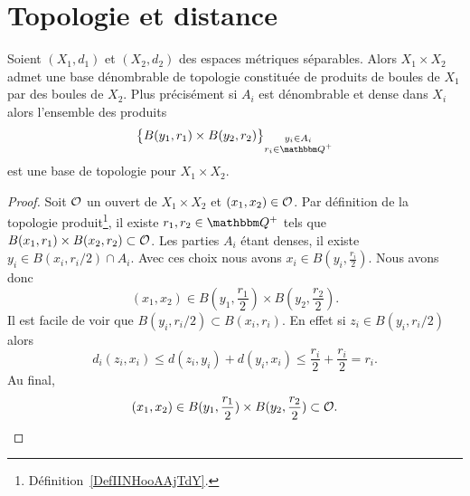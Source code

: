 
\section{Topologie et distance}

\begin{lemma}   \label{LemDUJXooWsnmpL}
    Soient \( (X_1,d_1)\) et \( (X_2,d_2)\) des espaces métriques séparables. Alors \( X_1\times X_2\) admet une base dénombrable de topologie constituée de produits de boules de \( X_1\) par des boules de \( X_2\). Plus précisément si $A_i$ est dénombrable et dense dans \( X_i\) alors l'ensemble des produits
    \begin{equation}
        \big\{ B(y_1,r_1)\times B(y_2,r_2)\big\}_{\substack{y_i\in A_i\\r_i\in \eQ^+}}
    \end{equation}
    est une base de topologie pour \( X_1\times X_2\).
\end{lemma}

\begin{proof}
    Soit \( \mathcal{O}\) un ouvert de \( X_1\times X_2\) et \( (x_1,x_2)\in \mathcal{O}\). Par définition de la topologie produit\footnote{Définition~\ref{DefIINHooAAjTdY}.}, il existe \( r_1,r_2\in \eQ^+\) tels que \( B(x_1,r_1)\times B(x_2,r_2)\subset\mathcal{O}\). Les parties \( A_i\) étant denses, il existe \( y_i\in B(x_i,r_i/2)\cap A_i\). Avec ces choix nous avons $x_i\in B(y_i,\frac{ r_i }{2})$. Nous avons donc
    \begin{equation}
        (x_1,x_2)\in B(y_1,\frac{ r_1 }{ 2 })\times B(y_2,\frac{ r_2 }{2}).
    \end{equation}
    Il est facile de voir que \( B(y_i,r_i/2)\subset B(x_i,r_i)\). En effet si \( z_i\in B(y_i,r_i/2)\) alors
    \begin{equation}
        d_i(z_i,x_i)\leq d(z_i,y_i)+d(y_i,x_i)\leq \frac{ r_i }{2}+\frac{ r_i }{2}=r_i.
    \end{equation}
    Au final,
    \begin{equation}
        (x_1,x_2)\in B(y_1,\frac{ r_1 }{ 2 })\times B(y_2,\frac{ r_2 }{2})\subset \mathcal{O}.
    \end{equation}
\end{proof}



